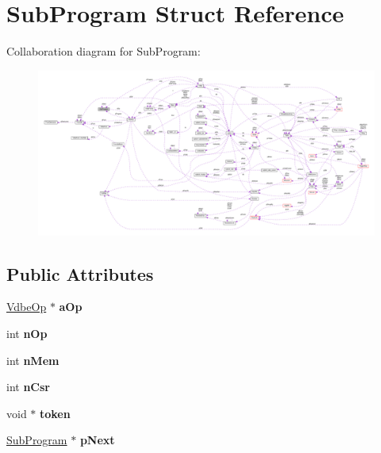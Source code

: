 \hypertarget{struct_sub_program}{\section{Sub\-Program Struct Reference}
\label{struct_sub_program}
}


Collaboration diagram for Sub\-Program\-:\nopagebreak
\begin{figure}[H]
\begin{center}
\leavevmode
\includegraphics[width=350pt]{struct_sub_program__coll__graph}
\end{center}
\end{figure}
\subsection*{Public Attributes}
\begin{DoxyCompactItemize}
\item 
\hypertarget{struct_sub_program_aa9bb1992fed633d182076a35d6448c7d}{\hyperlink{struct_vdbe_op}{Vdbe\-Op} $\ast$ {\bfseries a\-Op}}\label{struct_sub_program_aa9bb1992fed633d182076a35d6448c7d}

\item 
\hypertarget{struct_sub_program_a6fe204a75ab8254c453be77f024b6d69}{int {\bfseries n\-Op}}\label{struct_sub_program_a6fe204a75ab8254c453be77f024b6d69}

\item 
\hypertarget{struct_sub_program_a9bece42fdeb81085809d7c2f8aa05616}{int {\bfseries n\-Mem}}\label{struct_sub_program_a9bece42fdeb81085809d7c2f8aa05616}

\item 
\hypertarget{struct_sub_program_a83b18aa5cc63aecdbf996c16af1e48bb}{int {\bfseries n\-Csr}}\label{struct_sub_program_a83b18aa5cc63aecdbf996c16af1e48bb}

\item 
\hypertarget{struct_sub_program_aaea3b67899b092476b107d22a4e2022d}{void $\ast$ {\bfseries token}}\label{struct_sub_program_aaea3b67899b092476b107d22a4e2022d}

\item 
\hypertarget{struct_sub_program_a7da35488ac58a64fa30b88da56aac8b3}{\hyperlink{struct_sub_program}{Sub\-Program} $\ast$ {\bfseries p\-Next}}\label{struct_sub_program_a7da35488ac58a64fa30b88da56aac8b3}

\end{DoxyCompactItemize}


